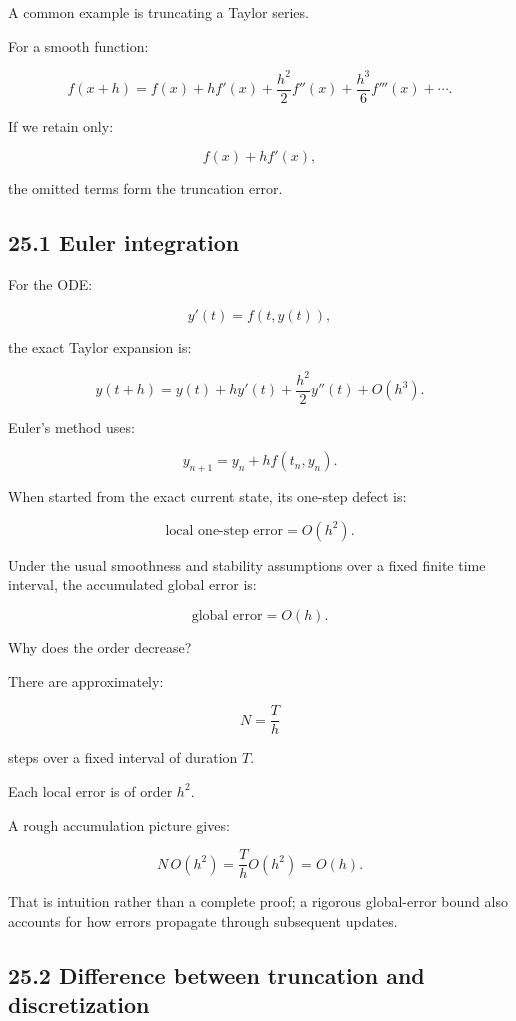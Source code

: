 A common example is truncating a Taylor series.

For a smooth function:

\[ f(x+h) = f(x)+hf'(x)+\frac{h^2}{2}f''(x) +\frac{h^3}{6}f'''(x)+\cdots. \]

If we retain only:

\[ f(x)+hf'(x), \]

the omitted terms form the truncation error.

\subsection{25.1 Euler integration}\label{02-foundations-ii-ch029-euler-integration}

For the ODE:

\[ y'(t)=f(t,y(t)), \]

the exact Taylor expansion is:

\[ y(t+h) = y(t)+hy'(t)+\frac{h^2}{2}y''(t)+O(h^3). \]

Euler's method uses:

\[ y_{n+1}=y_n+hf(t_n,y_n). \]

When started from the exact current state, its one-step defect is:

\[ \boxed{ \text{local one-step error}=O(h^2) }. \]

Under the usual smoothness and stability assumptions over a fixed finite time interval, the accumulated global error is:

\[ \boxed{ \text{global error}=O(h) }. \]

Why does the order decrease?

There are approximately:

\[ N=\frac Th \]

steps over a fixed interval of duration \(T\).

Each local error is of order \(h^2\).

A rough accumulation picture gives:

\[ N\,O(h^2) = \frac Th O(h^2) = O(h). \]

That is intuition rather than a complete proof; a rigorous global-error bound also accounts for how errors propagate through subsequent updates.

\subsection{25.2 Difference between truncation and discretization}\label{02-foundations-ii-ch029-difference-between-truncation-and-discretization}

